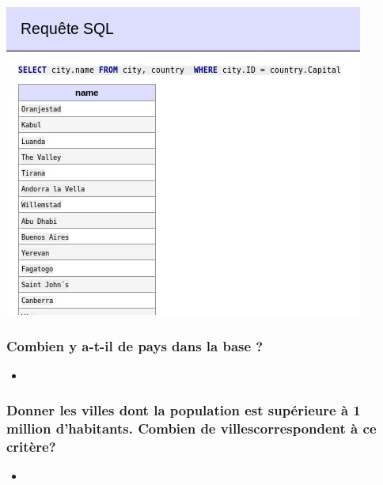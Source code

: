 \documentclass[a4paper,10pt]{article}
\newcommand{\insertcode}[2]{\begin{itemize}\item[]\end{itemize}}
\begin{document}
\includegraphics[scale=0.8]{ressource/3.jpg}

\newpage


\subsubsection{Combien y a-t-il de pays dans la base ? }
\insertcode{commande/5.txt}{count() }
\subsubsection{Donner les villes dont la population est supérieure à 1 million d’habitants. Combien de villescorrespondent à ce critère?}

\insertcode{commande/6.txt}{Requetes}
\end{document}
